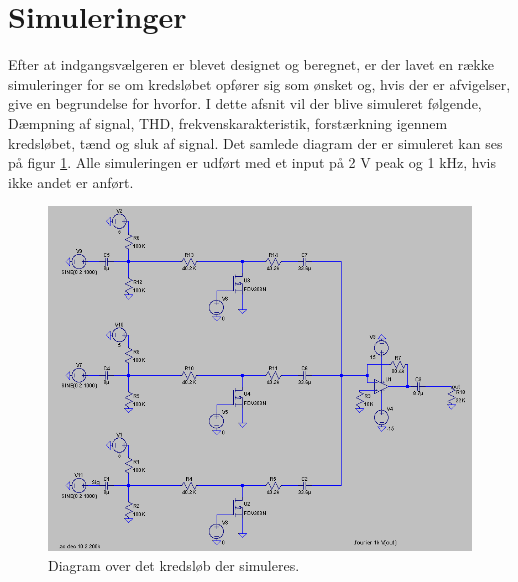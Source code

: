\section*{Simuleringer}
Efter at indgangsvælgeren er blevet designet og beregnet, er der lavet en række simuleringer for se om kredsløbet opfører sig som ønsket og, hvis der er afvigelser, give en begrundelse for hvorfor. I dette afsnit vil der blive simuleret følgende, Dæmpning af signal, THD, frekvenskarakteristik, forstærkning igennem kredsløbet, tænd og sluk af signal. Det samlede diagram der er simuleret kan ses på figur \ref{diagram_simulering}. Alle simuleringen er udført med et input på 2 V peak og 1 kHz, hvis ikke andet er anført.

\begin{figure}[h]
\centering
\includegraphics[scale=0.4]{teknisk/indgangsvaelger/simulering/indgangvaelger_ltspice_diagram.png}
\caption{Diagram over det kredsløb der simuleres.}
\label{diagram_simulering}
\end{figure}

